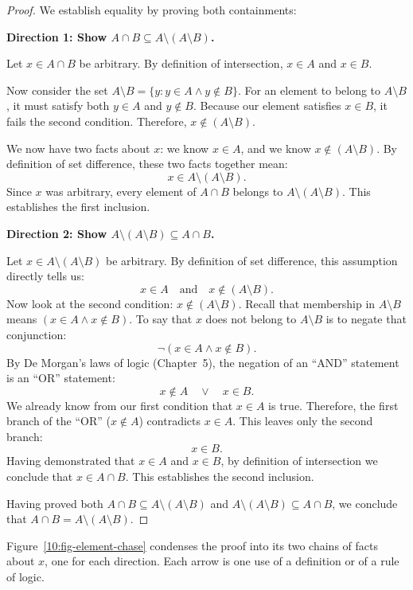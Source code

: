 \begin{proof}
We establish equality by proving both containments:

\textbf{Direction 1: Show $A \cap B \subseteq A \setminus (A \setminus B)$.}

Let $x \in A \cap B$ be arbitrary. By definition of intersection, $x \in A$ and $x \in B$.

Now consider the set $A \setminus B = \{y : y \in A \land y \notin B\}$. For an element to belong to $A \setminus B$, it must satisfy both $y \in A$ and $y \notin B$. Because our element satisfies $x \in B$, it fails the second condition. Therefore, $x \notin (A \setminus B)$.

We now have two facts about $x$: we know $x \in A$, and we know $x \notin (A \setminus B)$. By definition of set difference, these two facts together mean:
\[
x \in A \setminus (A \setminus B).
\]
Since $x$ was arbitrary, every element of $A \cap B$ belongs to $A \setminus (A \setminus B)$. This establishes the first inclusion.

\textbf{Direction 2: Show $A \setminus (A \setminus B) \subseteq A \cap B$.}

Let $x \in A \setminus (A \setminus B)$ be arbitrary. By definition of set difference, this assumption directly tells us:
\[
x \in A \quad \text{and} \quad x \notin (A \setminus B).
\]
Now look at the second condition: $x \notin (A \setminus B)$. Recall that membership in $A \setminus B$ means $(x \in A \land x \notin B)$. To say that $x$ does not belong to $A \setminus B$ is to negate that conjunction:
\[
\neg(x \in A \land x \notin B).
\]
By De Morgan's laws of logic (Chapter~5), the negation of an ``AND'' statement is an ``OR'' statement:
\[
x \notin A \quad \lor \quad x \in B.
\]
We already know from our first condition that $x \in A$ is true. Therefore, the first branch of the ``OR'' ($x \notin A$) contradicts $x \in A$. This leaves only the second branch:
\[
x \in B.
\]
Having demonstrated that $x \in A$ and $x \in B$, by definition of intersection we conclude that $x \in A \cap B$. This establishes the second inclusion.

Having proved both $A \cap B \subseteq A \setminus (A \setminus B)$ and $A \setminus (A \setminus B) \subseteq A \cap B$, we conclude that $A \cap B = A \setminus (A \setminus B)$.
\end{proof}

Figure~\ref{10:fig-element-chase} condenses the proof into its two chains of facts about $x$, one for each direction. Each arrow is one use of a definition or of a rule of logic.

